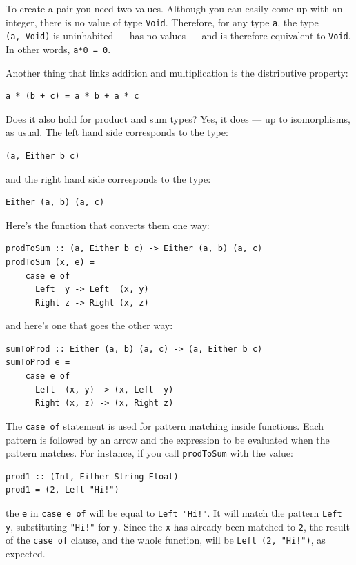 To create a pair you need two values. Although you can easily come up
with an integer, there is no value of type \texttt{Void}. Therefore, for
any type \texttt{a}, the type \texttt{(a,\ Void)} is uninhabited --- has
no values --- and is therefore equivalent to \texttt{Void}. In other
words, \texttt{a*0 = 0}.

Another thing that links addition and multiplication is the distributive
property:

\begin{verbatim}
a * (b + c) = a * b + a * c
\end{verbatim}

\noindent
Does it also hold for product and sum types? Yes, it does --- up to
isomorphisms, as usual. The left hand side corresponds to the type:

\begin{verbatim}
(a, Either b c)
\end{verbatim}

\noindent
and the right hand side corresponds to the type:

\begin{verbatim}
Either (a, b) (a, c)
\end{verbatim}

\noindent
Here's the function that converts them one way:

\begin{verbatim}
prodToSum :: (a, Either b c) -> Either (a, b) (a, c)
prodToSum (x, e) = 
    case e of
      Left  y -> Left  (x, y)
      Right z -> Right (x, z)
\end{verbatim}

\noindent
and here's one that goes the other way:

\begin{verbatim}
sumToProd :: Either (a, b) (a, c) -> (a, Either b c)
sumToProd e =
    case e of
      Left  (x, y) -> (x, Left  y)
      Right (x, z) -> (x, Right z)
\end{verbatim}

\noindent
The \texttt{case\ of} statement is used for pattern matching inside
functions. Each pattern is followed by an arrow and the expression to be
evaluated when the pattern matches. For instance, if you call
\texttt{prodToSum} with the value:

\begin{verbatim}
prod1 :: (Int, Either String Float)
prod1 = (2, Left "Hi!")
\end{verbatim}

\noindent
the \texttt{e} in \texttt{case e of} will be equal to
\texttt{Left "Hi!"}. It will match the pattern \texttt{Left y},
substituting \texttt{"Hi!"} for \texttt{y}. Since the \texttt{x} has
already been matched to \texttt{2}, the result of the \texttt{case of}
clause, and the whole function, will be \texttt{Left (2, "Hi!")}, as
expected.

